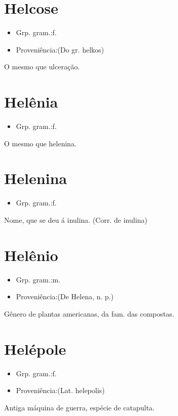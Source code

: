 \documentclass{article}
\begin{document}
\section{Helcose}
\begin{itemize}
\item {Grp. gram.:f.}
\end{itemize}
\begin{itemize}
\item {Proveniência:(Do gr. \textunderscore helkos\textunderscore )}
\end{itemize}
O mesmo que \textunderscore ulceração\textunderscore .
\section{Helênia}
\begin{itemize}
\item {Grp. gram.:f.}
\end{itemize}
O mesmo que \textunderscore helenina\textunderscore .
\section{Helenina}
\begin{itemize}
\item {Grp. gram.:f.}
\end{itemize}
Nome, que se deu á inulina.
(Corr. de \textunderscore inulina\textunderscore )
\section{Helênio}
\begin{itemize}
\item {Grp. gram.:m.}
\end{itemize}
\begin{itemize}
\item {Proveniência:(De \textunderscore Helena\textunderscore , n. p.)}
\end{itemize}
Gênero de plantas americanas, da fam. das compostas.
\section{Helépole}
\begin{itemize}
\item {Grp. gram.:f.}
\end{itemize}
\begin{itemize}
\item {Proveniência:(Lat. \textunderscore helepolis\textunderscore )}
\end{itemize}
Antiga máquina de guerra, espécie de catapulta.
\end{document}
